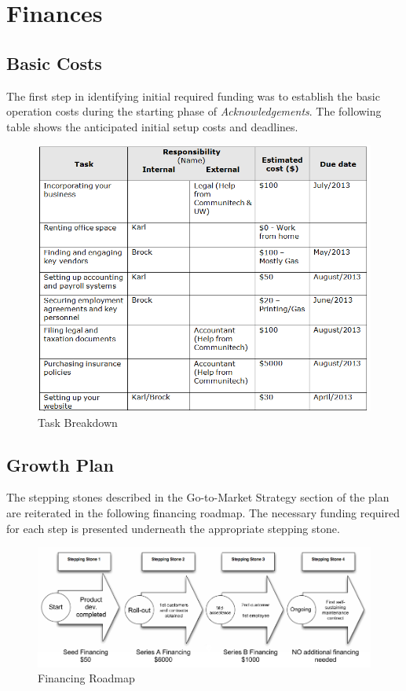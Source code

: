 \section{Finances}

\subsection{Basic Costs}
The first step in identifying initial required funding was to establish the basic operation costs during the starting phase of {\it Acknowledgements}. The following table shows the anticipated initial setup costs and deadlines.

\begin{figure}[ht!]
\centering
\includegraphics[width=150mm]{images/TaskList.png}
\caption{Task Breakdown}
\label{tasks}
\end{figure}

\subsection{Growth Plan}
The stepping stones described in the Go-to-Market Strategy section of the plan are reiterated in the following financing roadmap. The necessary funding required for each step is presented underneath the appropriate stepping stone.

\begin{figure}[ht!]
\centering
\includegraphics[width=150mm]{images/MSCI454-FinancingRoadmap.png}
\caption{Financing Roadmap}
\label{steppingStones}
\end{figure}
 

